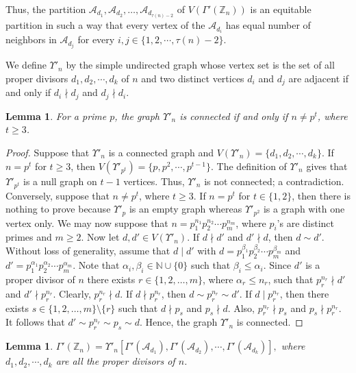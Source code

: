 \documentclass{amsart}
\theoremstyle{plain}
\newtheorem{lemma}[theorem]{Lemma}
\theoremstyle{definition}
\theoremstyle{remark}
\begin{document}
Thus, the partition $\mathcal{A}_{d_{1}}, \mathcal{A}_{d_{2}}, \ldots,  \mathcal{A}_{d_{\tau(n) - 2}}$ of $V(\Gamma'(\mathbb{Z}_n))$ is an equitable partition in such a way that every vertex of the $\mathcal{A}_{d_{i}}$ has equal number of neighbors in $\mathcal{A}_{d_{j}}$ for every $i, j \in \{1, 2, \cdots, \tau(n)- 2\}$.

We define $\Upsilon'_n$ by the simple undirected graph whose vertex set is the set of all proper divisors $d_1, d_2, \cdots, d_k$ of $n$ and two distinct vertices $d_i$ and $d_j$ are adjacent if and only if $d_i \nmid d_j$ and $d_j \nmid d_i$.

\begin{lemma}\label{connectednessofcozero}
For a prime $p$, the graph $\Upsilon'_n$ is connected if and only if $n \neq p^t$, where $t \geq 3$.
\end{lemma}
\begin{proof}
Suppose that $\Upsilon'_n$ is a connected graph and $V(\Upsilon'_n) = \{d_1, d_2, \cdots, d_k\}$. If $n = p^t$ for $t \geq 3$, then $V(\Upsilon'_{p^t}) = \{p, p^2, \cdots, p^{t-1}\}$. The definition of $\Upsilon'_n$ gives that $\Upsilon'_{p^t}$ is a null graph on $t-1$ vertices. Thus, $\Upsilon'_n$ is not connected; a contradiction. Conversely, suppose that $n \neq p^t$, where $t \geq 3$. If $n = p^t$ for $t \in \{1, 2\}$, then there is nothing to prove because $\Upsilon'_p$ is an empty graph whereas $\Upsilon'_{p^2}$ is a graph with one vertex only. We may now suppose that $n = p_1^{n_1}p_2^{n_2}\cdots p_m^{n_m}$, where $p_i$'s are distinct primes and $m \geq 2$. Now let $d, d' \in V(\Upsilon'_n)$. If $d \nmid d'$ and $d' \nmid d$, then $d \sim d'$. Without loss of generality, assume that $d \mid d'$ with $d = p_1^{\beta_1}p_2^{\beta_2}\cdots p_m^{\beta_m}$ and $d' = p_1^{\alpha_1}p_2^{\alpha_2}\cdots p_m^{\alpha_m}$. Note that $\alpha_i, \beta_i \in \mathbb{N} \cup \{0\}$ such that $\beta_i \leq \alpha_i$. Since $d'$ is a proper divisor of $n$ there exists $r \in \{1, 2, \ldots, m\}$, where $\alpha_r \leq n_r$,  such that $p_r^{n_r} \nmid d'$ and $d' \nmid p_r^{n_r}$. Clearly, $p_r^{n_r} \nmid d$. If $d \nmid p_r^{n_r}$, then $d \sim p_r^{n_r} \sim d'$. If $d \mid p_r^{n_r}$, then there exists $s \in \{1, 2, \ldots, m\}\setminus \{r\}$ such that $d \nmid p_s$ and $p_s \nmid d$. Also, $p_r^{n_r} \nmid p_s$ and $p_s \nmid p_r^{n_r}$. It follows that $d' \sim p_r^{n_r} \sim p_s \sim d$. Hence, the graph $\Upsilon'_n$ is connected.
\end{proof}

\begin{lemma}\label{inducedsubgraphequaltogamma}
$\Gamma'(\mathbb{Z}_n) = \Upsilon'_n [\Gamma'(\mathcal{A}_{d_1}), \Gamma'(\mathcal{A}_{d_2}), \cdots, \Gamma'(\mathcal{A}_{d_k})],$
where $d_1, d_2, \cdots, d_k$ are all the proper divisors of $n$. 
\end{lemma}
\end{document}
